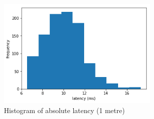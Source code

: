 \begin{figure}[htbp]
  \centering
    \includegraphics[width=0.7\textwidth]{Chapters/Figures/technical/Latency/figure4.png}
    \caption{Histogram of absolute latency (1 metre)}
    \label{fig:latency_fig4}
\end{figure}


